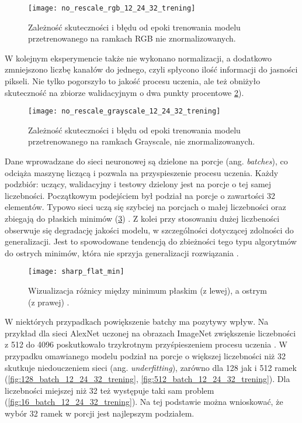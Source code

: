 \begin{figure}[h!]
	\centering
	\centering
		\texttt{[image: no\_rescale\_rgb\_12\_24\_32\_trening]}	
	\caption{Zależność skuteczności i błędu od epoki trenowania modelu przetrenowanego na ramkach RGB nie znormalizowanych.}	\label{fig:no_rescale_rgb_12_24_32_trening}
\end{figure}

{\parindent0pt
W kolejnym eksperymencie także nie wykonano normalizacji, a dodatkowo zmniejszono liczbę kanałów do jednego, czyli spłycono ilość informacji do jasności pikseli. Nie tylko pogorszyło to jakość procesu uczenia, ale też obniżyło skuteczność na zbiorze walidacyjnym o dwa punkty procentowe \ref{fig:no_rescale_grayscale_12_24_32_trening}).

\begin{figure}[h!]
	\centering
	\centering
		\texttt{[image: no\_rescale\_grayscale\_12\_24\_32\_trening]}	
	\caption{Zależność skuteczności i błędu od epoki trenowania modelu przetrenowanego na ramkach Grayscale, nie znormalizowanych.}	\label{fig:no_rescale_grayscale_12_24_32_trening}
\end{figure}

Dane wprowadzane do sieci neuronowej są dzielone na porcje (ang. \textit{batches}), co odciąża maszynę liczącą i pozwala na przyspieszenie procesu uczenia. Każdy podzbiór: uczący, walidacyjny i testowy dzielony jest na porcje o tej samej liczebności. Początkowym podejściem był podział na porcje o zawartości 32 elementów. Typowo sieci uczą się szybciej na porcjach o małej liczebności oraz zbiegają do płaskich minimów (\ref{fig:sharp_flat_min}) . Z kolei przy stosowaniu dużej liczbeności obserwuje się degradację jakości modelu, w szczególności dotyczącej zdolności do generalizacji. Jest to spowodowane tendencją do zbieżności tego typu algorytmów do ostrych minimów, która nie sprzyja generalizacji rozwiązania \cite{Keskar2016OnLT}. 

\begin{figure}[h!]
	\centering
	\centering
		\texttt{[image: sharp\_flat\_min]}	
	\caption{Wizualizacja różnicy między minimum płaskim (z lewej), a ostrym (z prawej) \cite{sharp_flat_min}.}	\label{fig:sharp_flat_min}
\end{figure}

W niektórych przypadkach powiększenie batchy ma pozytywy wpływ. Na przykład dla sieci AlexNet uczonej na obrazach ImageNet zwiększenie liczebności z 512 do 4096 poskutkowało trzykrotnym przyśpieszeniem procesu uczenia \cite{You2017ScalingSB}. W przypadku omawianego modelu podział na porcje o większej liczebności niż 32 skutkuje niedouczeniem sieci (ang. \textit{underfitting}), zarówno dla 128 jak i 512 ramek (\ref{fig:128_batch_12_24_32_trening}, \ref{fig:512_batch_12_24_32_trening}). Dla liczebności miejszej niż 32 też występuje taki sam problem (\ref{fig:16_batch_12_24_32_trening}). Na tej podstawie można wnioskować, że wybór 32 ramek w porcji jest najlepszym podziałem.

}
